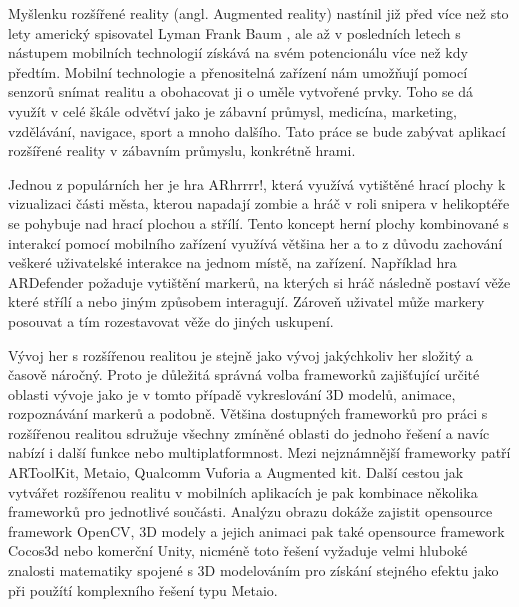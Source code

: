 \documentclass[oneside,12pt]{article}
\begin{document}
\def\,{\penalty10000\hskip.25em}
\pagestyle{headings}
\bakalarska
{}

\obsah

\newpage
%
%
% 
Myšlenku rozšířené reality (angl. Augmented reality) nastínil již před více než sto lety americký spisovatel Lyman Frank Baum \cite{baum}, ale až v posledních letech s nástupem mobilních technologií získává na svém potencionálu více než kdy předtím. Mobilní technologie a přenositelná zařízení nám umožňují pomocí senzorů snímat realitu a obohacovat ji o uměle vytvořené prvky. Toho se dá využít v celé škále odvětví jako je zábavní průmysl, medicína, marketing, vzdělávání, navigace, sport a mnoho dalšího. Tato práce se bude zabývat aplikací rozšířené reality v zábavním průmyslu, konkrétně hrami. 

Jednou z populárních her je hra ARhrrrr!, která využívá vytištěné hrací plochy k vizualizaci části města, kterou napadají zombie a hráč v roli snipera v helikoptéře se pohybuje nad hrací plochou a střílí. Tento koncept herní plochy kombinované s interakcí pomocí mobilního zařízení využívá většina her a to z důvodu zachování veškeré uživatelské interakce na jednom místě, na zařízení. Například hra ARDefender požaduje vytištění markerů, na kterých si hráč následně postaví věže které střílí a nebo jiným způsobem interagují. Zároveň uživatel může markery posouvat a tím rozestavovat věže do jiných uskupení.

Vývoj her s rozšířenou realitou je stejně jako vývoj jakýchkoliv her složitý a časově náročný. Proto je důležitá správná volba frameworků zajišťující určité oblasti vývoje jako je v tomto případě vykreslování 3D modelů, animace, rozpoznávání markerů a podobně. Většina dostupných frameworků pro práci s rozšířenou realitou sdružuje všechny zmíněné oblasti do jednoho řešení a navíc nabízí i další funkce nebo multiplatformnost. Mezi nejznámnější frameworky patří ARToolKit, Metaio, Qualcomm Vuforia a Augmented kit. Další cestou jak vytvářet rozšířenou realitu v mobilních aplikacích je pak kombinace několika frameworků pro jednotlivé součásti. Analýzu obrazu dokáže zajistit opensource framework OpenCV, 3D modely a jejich animaci pak také opensource framework Cocos3d nebo komerční Unity, nicméně toto řešení vyžaduje velmi hluboké znalosti matematiky spojené s 3D modelováním pro získání stejného efektu jako při použítí komplexního řešení typu Metaio.
\end{document}
